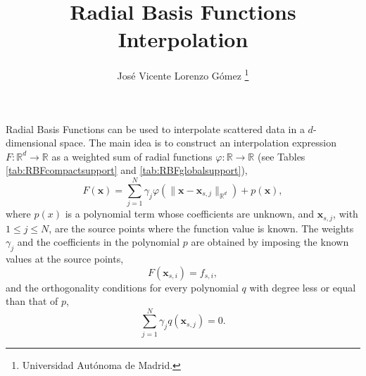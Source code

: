 \documentclass[12pt,a4paper]{article}
\theoremstyle{plain}
\theoremstyle{definition}
\begin{document}


\title{Radial Basis Functions Interpolation}
\author{José Vicente Lorenzo Gómez \thanks{Universidad Autónoma de Madrid.}}

\maketitle

Radial Basis Functions can be used to interpolate scattered data in a $d$-dimensional space. The main idea is to construct an interpolation expression $F: \mathbb{R}^d \rightarrow \mathbb{R}$ as a weighted sum of radial functions $\varphi: \mathbb{R} \rightarrow \mathbb{R}$ (see Tables \ref{tab:RBFcompactsupport} and \ref{tab:RBFglobalsupport}),
%
\begin{equation} \label{eq:RBFinterpolation}
F \left( \mathbf{x} \right) = \sum_{j=1}^N \gamma_j \varphi \left( \| \mathbf{x} - \mathbf{x}_{s, j} \|_{\mathbb{R}^d} \right) + p \left( \mathbf{x} \right),
\end{equation}
%
where $p \left( x \right)$ is a polynomial term whose coefficients are unknown, and $\mathbf{x}_{s, j}$, with $1 \leq j \leq N$, are the source points where the function value is known. The weights $\gamma_j$ and the coefficients in the polynomial $p$ are obtained by imposing the known values at the source points,
%
\begin{equation} \label{eq:RBFinterpolationconditions}
F \left( \mathbf{x}_{s, i} \right) = f_{s, i},
\end{equation}
%
and the orthogonality conditions for every polynomial $q$ with degree less or equal than that of $p$,
%
\begin{equation} \label{eq:RBForthogonality}
\sum_{j=1}^N \gamma_j q \left( \mathbf{x}_{s,j} \right) = 0.
\end{equation}
\end{document}
